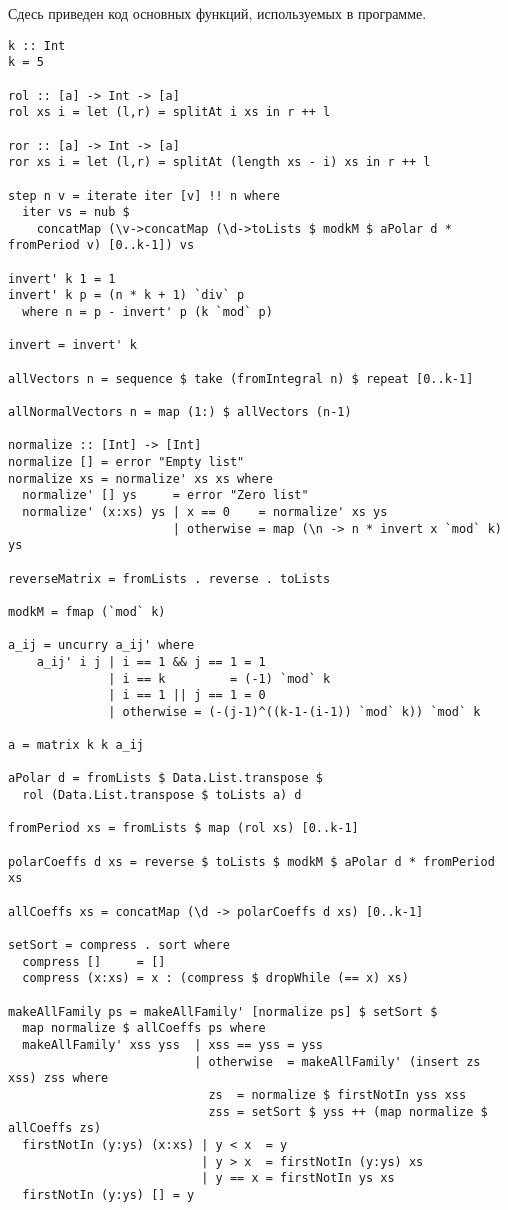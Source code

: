 \documentclass[bibliography=totoc, a4paper, 14pt]{extarticle}
\begin{document}
Сдесь приведен код основных функций, используемых в программе.
\begin{footnotesize}
\begin{verbatim}
k :: Int
k = 5

rol :: [a] -> Int -> [a]
rol xs i = let (l,r) = splitAt i xs in r ++ l

ror :: [a] -> Int -> [a]
ror xs i = let (l,r) = splitAt (length xs - i) xs in r ++ l

step n v = iterate iter [v] !! n where
  iter vs = nub $ 
    concatMap (\v->concatMap (\d->toLists $ modkM $ aPolar d * fromPeriod v) [0..k-1]) vs

invert' k 1 = 1
invert' k p = (n * k + 1) `div` p
  where n = p - invert' p (k `mod` p)

invert = invert' k

allVectors n = sequence $ take (fromIntegral n) $ repeat [0..k-1]

allNormalVectors n = map (1:) $ allVectors (n-1)

normalize :: [Int] -> [Int]
normalize [] = error "Empty list"
normalize xs = normalize' xs xs where
  normalize' [] ys     = error "Zero list"
  normalize' (x:xs) ys | x == 0    = normalize' xs ys
                       | otherwise = map (\n -> n * invert x `mod` k) ys

reverseMatrix = fromLists . reverse . toLists

modkM = fmap (`mod` k)

a_ij = uncurry a_ij' where
    a_ij' i j | i == 1 && j == 1 = 1
              | i == k         = (-1) `mod` k
              | i == 1 || j == 1 = 0
              | otherwise = (-(j-1)^((k-1-(i-1)) `mod` k)) `mod` k

a = matrix k k a_ij

aPolar d = fromLists $ Data.List.transpose $
  rol (Data.List.transpose $ toLists a) d

fromPeriod xs = fromLists $ map (rol xs) [0..k-1]

polarCoeffs d xs = reverse $ toLists $ modkM $ aPolar d * fromPeriod xs

allCoeffs xs = concatMap (\d -> polarCoeffs d xs) [0..k-1]

setSort = compress . sort where
  compress []     = []
  compress (x:xs) = x : (compress $ dropWhile (== x) xs)

makeAllFamily ps = makeAllFamily' [normalize ps] $ setSort $
  map normalize $ allCoeffs ps where
  makeAllFamily' xss yss  | xss == yss = yss    
                          | otherwise  = makeAllFamily' (insert zs xss) zss where
                            zs  = normalize $ firstNotIn yss xss
                            zss = setSort $ yss ++ (map normalize $ allCoeffs zs)
  firstNotIn (y:ys) (x:xs) | y < x  = y
                           | y > x  = firstNotIn (y:ys) xs
                           | y == x = firstNotIn ys xs
  firstNotIn (y:ys) [] = y


\end{verbatim}
\end{footnotesize}
\end{document}
